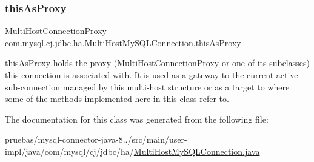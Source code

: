 \subsubsection{\texorpdfstring{this\+As\+Proxy}{thisAsProxy}}
{\footnotesize\ttfamily \mbox{\hyperlink{classcom_1_1mysql_1_1cj_1_1jdbc_1_1ha_1_1_multi_host_connection_proxy}{Multi\+Host\+Connection\+Proxy}} com.\+mysql.\+cj.\+jdbc.\+ha.\+Multi\+Host\+My\+S\+Q\+L\+Connection.\+this\+As\+Proxy\hspace{0.3cm}{\ttfamily [protected]}}

this\+As\+Proxy holds the proxy (\mbox{\hyperlink{classcom_1_1mysql_1_1cj_1_1jdbc_1_1ha_1_1_multi_host_connection_proxy}{Multi\+Host\+Connection\+Proxy}} or one of its subclasses) this connection is associated with. It is used as a gateway to the current active sub-\/connection managed by this multi-\/host structure or as a target to where some of the methods implemented here in this class refer to. 

The documentation for this class was generated from the following file\+:\begin{DoxyCompactItemize}
\item 
pruebas/mysql-\/connector-\/java-\/8../src/main/user-\/impl/java/com/mysql/cj/jdbc/ha/\mbox{\hyperlink{_multi_host_my_s_q_l_connection_8java}{Multi\+Host\+My\+S\+Q\+L\+Connection.\+java}}\end{DoxyCompactItemize}
